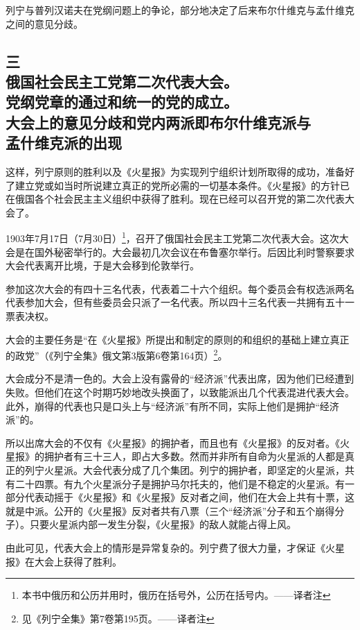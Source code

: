 列宁与普列汉诺夫在党纲问题上的争论，部分地决定了后来布尔什维克与孟什维克之间的意见分歧。


\subsection[三\q 俄国社会民主工党第二次代表大会。党纲党章的通过和统一的党的成立。大会上的意见分歧和党内两派即布尔什维克派与孟什维克派的出现]{三\\ 俄国社会民主工党第二次代表大会。\\ 党纲党章的通过和统一的党的成立。\\ 大会上的意见分歧和党内两派即布尔什维克派与\\孟什维克派的出现}

这样，列宁原则的胜利以及《火星报》为实现列宁组织计划所取得的成功，准备好了建立党或如当时所说建立真正的党所必需的一切基本条件。《火星报》的方针已在俄国各个社会民主主义组织中获得了胜利。现在已经可以召开党的第二次代表大会了。

1903年7月17日（7月30日）\footnote{本书中俄历和公历并用时，俄历在括号外，公历在括号内。——译者注}，召开了俄国社会民主工党第二次代表大会。这次大会是在国外秘密举行的。大会最初几次会议在布鲁塞尔举行。后因比利时警察要求大会代表离开比境，于是大会移到伦敦举行。

参加这次大会的有四十三名代表，代表着二十六个组织。每个委员会有权选派两名代表参加大会，但有些委员会只派了一名代表。所以四十三名代表一共拥有五十一票表决权。

大会的主要任务是“在《火星报》所提出和制定的原则的和组织的基础上建立真正的政党”（《列宁全集》俄文第3版第6卷第164页）\footnote{见《列宁全集》第7卷第195页。——译者注}。

大会成分不是清一色的。大会上没有露骨的“经济派”代表出席，因为他们已经遭到失败。但他们在这个时期巧妙地改头换面了，以致能派出几个代表混进代表大会。此外，崩得的代表也只是口头上与“经济派”有所不同，实际上他们是拥护“经济派”的。

所以出席大会的不仅有《火星报》的拥护者，而且也有《火星报》的反对者。《火星报》的拥护者有三十三人，即占大多数。然而并非所有自命为火星派的人都是真正的列宁火星派。大会代表分成了几个集团。列宁的拥护者，即坚定的火星派，共有二十四票。有九个火星派分子是拥护马尔托夫的，他们是不稳定的火星派。有一部分代表动摇于《火星报》和《火星报》反对者之间，他们在大会上共有十票，这就是中派。公开的《火星报》反对者共有八票（三个“经济派”分子和五个崩得分子）。只要火星派内部一发生分裂，《火星报》的敌人就能占得上风。

由此可见，代表大会上的情形是异常复杂的。列宁费了很大力量，才保证《火星报》在大会上获得了胜利。

